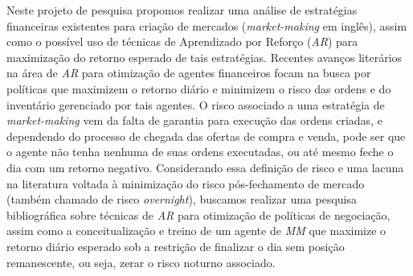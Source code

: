 Neste projeto de pesquisa propomos realizar uma análise de estratégias financeiras existentes para criação de mercados (\textit{market-making} em inglês), assim como o possível uso de técnicas de Aprendizado por Reforço (\textit{AR}) para maximização do retorno esperado de tais estratégias. Recentes avanços literários na área de \textit{AR} para otimização de agentes financeiros focam na busca por políticas que maximizem o retorno diário e minimizem o risco das ordens e do inventário gerenciado por tais agentes. O risco associado a uma estratégia de \textit{market-making} vem da falta de garantia para execução das ordens criadas, e dependendo do processo de chegada das ofertas de compra e venda, pode ser que o agente não tenha nenhuma de suas ordens executadas, ou até mesmo feche o dia com um retorno negativo. Considerando essa definição de risco e uma lacuna na literatura voltada à minimização do risco pós-fechamento de mercado (também chamado de risco \textit{overnight}), buscamos realizar uma pesquisa bibliográfica sobre técnicas de \textit{AR} para otimização de políticas de negociação, assim como a conceitualização e treino de um agente de \textit{MM} que maximize o retorno diário esperado sob a restrição de finalizar o dia sem posição remanescente, ou seja, zerar o risco noturno associado. 
